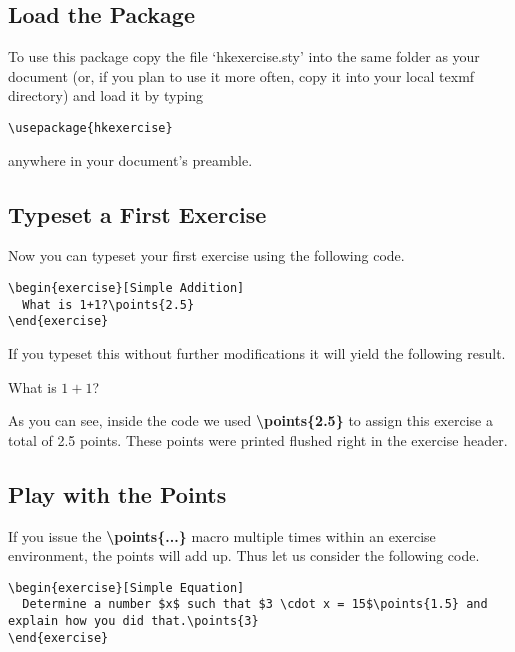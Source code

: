 \documentclass[
  twocolumn,%
  fontsize=9pt,%
  DIV=calc,%
  numbers=noendperiod%
]{scrartcl}
\begin{document}
\subsection{Load the Package}
To use this package copy the file `hkexercise.sty' into the same folder as your document (or, if you plan to use it more often, copy it into your local texmf directory) and load it by typing
\begin{lstlisting}
\usepackage{hkexercise}
\end{lstlisting}
anywhere in your document's preamble. 

\subsection{Typeset a First Exercise}
Now you can typeset your first exercise using the following code.

\begin{lstlisting}
\begin{exercise}[Simple Addition]
  What is 1+1?\points{2.5}
\end{exercise}
\end{lstlisting}

\noindent If you typeset this without further modifications it will yield the following result.

\begin{exercise}
  What is $1+1$?
\end{exercise}
%
As you can see, inside the code we used \textcolor{NavyBlue}{\ttfamily\bfseries \textbackslash points\{2.5\}} to assign this exercise a total of 2.5 points. These points were printed flushed right in the exercise header.

\subsection{Play with the Points}
If you issue the \textcolor{NavyBlue}{\ttfamily\bfseries \textbackslash points\{...\}} macro multiple times within an exercise environment, the points will add up. Thus let us consider the following code.

\begin{lstlisting}
\begin{exercise}[Simple Equation]
  Determine a number $x$ such that $3 \cdot x = 15$\points{1.5} and explain how you did that.\points{3}
\end{exercise} 
\end{lstlisting}
\end{document}
